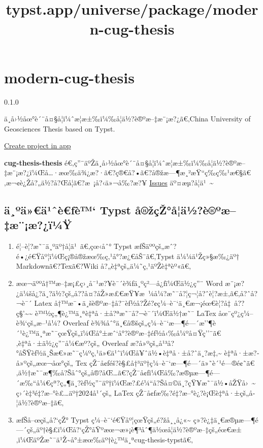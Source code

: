 \title{typst.app/universe/package/modern-cug-thesis}

\label{banner}
\label{template-thumbnail}

\section{modern-cug-thesis}\label{modern-cug-thesis}

{ 0.1.0 }

ä¸­å›½åœ°è´¨å¤§å­¦ï¼ˆæ­¦æ±‰ï¼‰å­¦ä½?è®ºæ--‡æ¨¡æ?¿ã€‚China University of
Geosciences Thesis based on Typst.

\href{/app?template=modern-cug-thesis&version=0.1.0}{Create project in
app}

\label{readme}
\textbf{cug-thesis-thesis}
é€‚ç''¨äºŽä¸­å›½åœ°è´¨å¤§å­¦ï¼ˆæ­¦æ±‰ï¼‰å­¦ä½?è®ºæ--‡æ¨¡æ?¿ï¼Œå\ldots·æœ‰ä¾¿æ?·ã€?ç®€å?•ã€?å®žæ---¶æ¸²æŸ``ç­‰ç‰¹æ€§ã€‚æ¬¢è¿Žå?„ä½?å?Œå­¦ã€?æ~¡å?‹ä»¬å‰?æ?¥
\href{https://github.com/Rsweater/cug-thesis-typst/issues}{Issues}
äº¤æµ?å­¦ä¹~\textasciitilde{}


\subsection{ä¸ºä»€ä¹ˆè€ƒè™` Typst
å®žçŽ°å­¦ä½?è®ºæ--‡æ¨¡æ?¿ï¼Ÿ}\label{uxe4uxbauxe4uxe4uxb9ux2c6uxe8ux192uxe8-typst-uxe5ux17euxe7ux17euxe5uxe4uxbduxe8uxbauxe6uxe6uxe6uxefuxbcuxff}

\begin{enumerate}
\tightlist
\item
  é¦--è¦?æ˜¯ä¸ºäº†å­¦ä¹~ã€‚çœ‹åˆ° Typst
  æƒŠäººçš„æˆ?é•¿é€Ÿåº¦ï¼Œç¡®å®žæœ‰ç‚¹å°?æ¿€åŠ¨ã€‚Typst ä¼¼ä¹Žç»§æ‰¿äº†
  Markdownã€?Texã€?Wiki å?„è‡ªçš„ä¼˜ç‚¹äºŽè‡ªèº«ã€‚
\item
  æœ¬äººå†™æ--‡æ¡£ç›¸å¯¹æ?¥è¯´è¾ƒä¸ºç²---å¿ƒï¼Œä½¿ç''¨ Word
  æ¨¡æ?¿ä¼šå¿?ä¸?ä½?çš„å??å¤?åŽ»æ£€æŸ¥æ~¼å¼?æ˜¯å?¦ç¬¦å?ˆè¦?æ±‚ã€‚å?ˆå?¬è¯´
  Latex
  å†™æ¯•ä¸šè®ºæ--‡å?¯èƒ½å?Žé?¢ç¼--è¯`ä¸€æ¬¡éœ€è¦?å‡~å??ç§'\textasciitilde\textasciitilde{}
  è™½ç„¶è¿™ä¸ªè‡ªå·±å?ªæ˜¯å?¬è¯´ï¼Œä½†æ˜¯ LaTex åœ¨çº¿ç¼--è¾`çš„æ--¹å¼?
  Overleaf
  è¾¾åˆ°ä¸€å®šçš„ç¼--è¯`æ---¶é---´æ''¶è´¹è¿™ä¸ªæ˜¯çœŸçš„ï¼Œå°±æˆ`å°?è®ºæ--‡éƒ½å‹‰å¼ºå¤Ÿç''¨ã€‚è‡ªå·±ä½¿ç''¨å¼€æº?çš„
  Overleaf
  æ?­å»ºçš„å¹³å?°åŠŸèƒ½ä¸Šæ€»æ˜¯ç¼ºç‚¹ä»€ä¹ˆï¼Œå¥ˆä½•è‡ªå·±å?ˆä¸?æ‡‚\textasciitilde{}
  è‡ªå·±æ?­å»ºçš„æœ¬åœ°çš„ Tex
  çŽ¯å¢ƒéš?è§£å†³äº†ç¼--è¯`æ---¶é---´ä»˜è´¹é---®é¢˜ã€‚ä½†æ˜¯æ¶‰å?Šåˆ°çš„å®?åŒ\ldots ã€?çŽ¯å¢ƒï¼Œå‰?æ®µæ---¶é---´æ‰``å¼€çª?ç„¶ä¸?èƒ½ç''¨äº†ï¼Œæ?£é¼``å?Šå¤©ä¸?çŸ¥æ˜¯ä½•åŽŸå›~\textasciitilde{}
  ç›´è‡³é‡?æ--°è£\ldots äº†2024å¹´çš„ LaTex
  çŽ¯å¢ƒæ‰?é‡?æ--°è¿?è¡Œè‡ªå·±çš„å­¦ä½?è®ºæ--‡ã€‚
\item
  æƒŠå--œçš„å?{}`çŽ° Typst ç¼--è¯`é€Ÿåº¦çœŸçš„é?žå¸¸å¿«\textasciitilde{}
  ç»?è¿‡ä¸€æ®µæ---¶é---´çš„äº†è§£ï¼Œå?{}`çŽ°åŸºæœ¬æ»¡è¶³åˆ¶ä½œå­¦ä½?è®ºæ--‡çš„éœ€æ±‚ï¼ŒäºŽæ˜¯ä¹Ž\textasciitilde å°±æœ‰äº†è¿™ä¸ªcug-thesis-typstã€‚
\end{enumerate}

